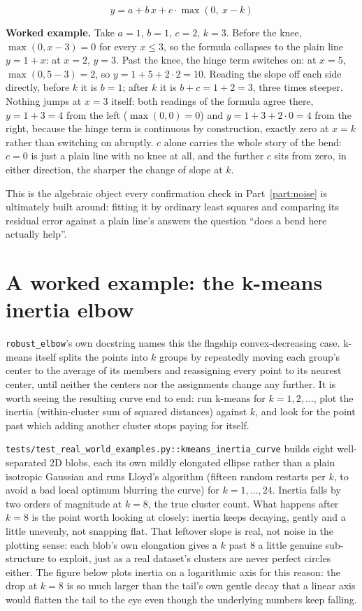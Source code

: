 \documentclass[11pt]{article}
\newcommand{\code}[1]{\texttt{#1}}
\begin{document}
\begin{equation}
y = a + b\,x + c \cdot \max(0,\ x - k)
\end{equation}

\textbf{Worked example.} Take $a=1$, $b=1$, $c=2$, $k=3$. Before the
knee, $\max(0, x-3)=0$ for every $x \le 3$, so the formula collapses to
the plain line $y = 1 + x$: at $x=2$, $y=3$. Past the knee, the hinge
term switches on: at $x=5$, $\max(0, 5-3)=2$, so $y = 1 + 5 + 2\cdot 2 =
10$. Reading the slope off each side directly, before $k$ it is $b=1$;
after $k$ it is $b+c=1+2=3$, three times steeper. Nothing jumps at
$x=3$ itself: both readings of the formula agree there, $y = 1 + 3 = 4$
from the left ($\max(0,0)=0$) and $y = 1+3+2\cdot 0 = 4$ from the right,
because the hinge term is continuous by construction, exactly zero at
$x=k$ rather than switching on abruptly. $c$ alone carries the whole
story of the bend: $c=0$ is just a plain line with no knee at all,
and the further $c$ sits from zero, in either direction, the sharper
the change of slope at $k$.

This is the algebraic object every confirmation check in
Part~\ref{part:noise} is ultimately built around: fitting it by ordinary
least squares and comparing its residual error against a plain line's
answers the question ``does a bend here actually help''.

\section{A worked example: the k-means inertia elbow}
\label{sec:kmeans-example}

\code{robust\_elbow}'s own docstring names this the flagship
convex-decreasing case. k-means itself splits the points into $k$
groups by repeatedly moving each group's center to the average of its
members and reassigning every point to its nearest center, until
neither the centers nor the assignments change any further. It is worth
seeing the resulting curve end to end: run k-means for $k = 1, 2,
\dots$, plot the inertia (within-cluster sum of squared distances)
against $k$, and look for the point past which adding another cluster
stops paying for itself.

\code{tests/test\_real\_world\_examples.py::\allowbreak kmeans\_inertia\_curve} builds
eight well-separated 2D blobs, each its own mildly elongated ellipse rather
than a plain isotropic Gaussian and runs Lloyd's algorithm (fifteen random
restarts per $k$, to avoid a bad local optimum blurring the curve) for $k =
1, \dots, 24$. Inertia falls by two orders of magnitude at $k = 8$, the true
cluster count. What happens after $k = 8$ is the point worth looking at
closely: inertia keeps decaying, gently and a little unevenly, not
snapping flat. That leftover slope is real, not noise in the plotting
sense: each blob's own elongation gives a $k$ past 8 a little genuine
sub-structure to exploit, just as a real dataset's clusters are never
perfect circles either. The figure below plots inertia on a logarithmic
axis for this reason: the drop at $k=8$ is so much larger than the tail's
own gentle decay that a linear axis would flatten the tail to the eye even
though the underlying numbers keep falling.
\end{document}
